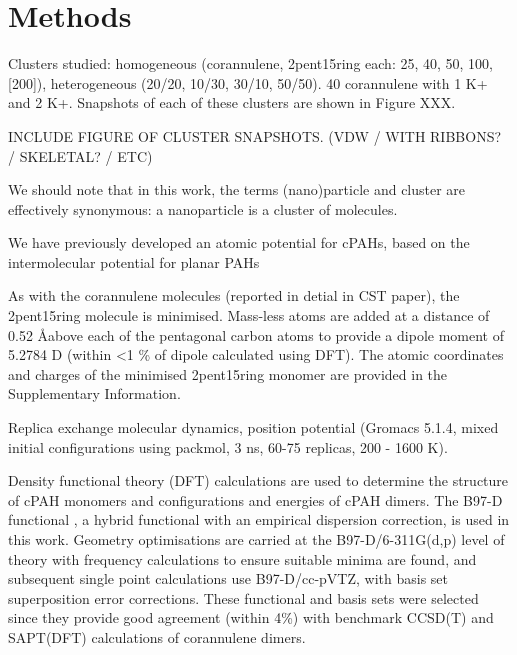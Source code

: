 



\section{Methods}
Clusters studied: homogeneous (corannulene, 2pent15ring each: 25, 40, 50, 100, [200]), heterogeneous (20/20, 10/30, 30/10, 50/50).
40 corannulene with 1 K+ and 2 K+.
Snapshots of each of these clusters are shown in Figure XXX.

INCLUDE FIGURE OF CLUSTER SNAPSHOTS. (VDW / WITH RIBBONS? / SKELETAL? / ETC)


We should note that in this work, the terms (nano)particle and cluster are effectively synonymous: a nanoparticle is a cluster of molecules.

We have previously developed an atomic potential for cPAHs, based on the intermolecular potential for planar PAHs 

As with the corannulene molecules (reported in detial in CST paper), the 2pent15ring molecule is minimised. Mass-less atoms are added at a distance of 0.52 \AA above each of the pentagonal carbon atoms to provide a dipole moment of 5.2784 D (within <1 \% of dipole calculated using DFT). The atomic coordinates and charges of the minimised 2pent15ring monomer are provided in the Supplementary Information.


Replica exchange molecular dynamics, position potential (Gromacs 5.1.4, mixed initial configurations using packmol, 3 ns, 60-75 replicas, 200 - 1600 K).


Density functional theory (DFT) calculations are used to determine the structure of cPAH monomers and configurations and energies of cPAH dimers. The B97-D functional \cite{grimme2006semiempirical}, a hybrid functional with an empirical dispersion correction, is used in this work.  Geometry optimisations are carried at the B97-D/6-311G(d,p) level of theory with frequency calculations to ensure suitable minima are found, and subsequent single point calculations use B97-D/cc-pVTZ, with basis set superposition error corrections.  These functional and basis sets were selected since they provide good agreement (within 4\%) with benchmark CCSD(T) \cite{janowski2011convex} and SAPT(DFT) \cite{Cabaleiro-Lago2018} calculations of corannulene dimers. %


